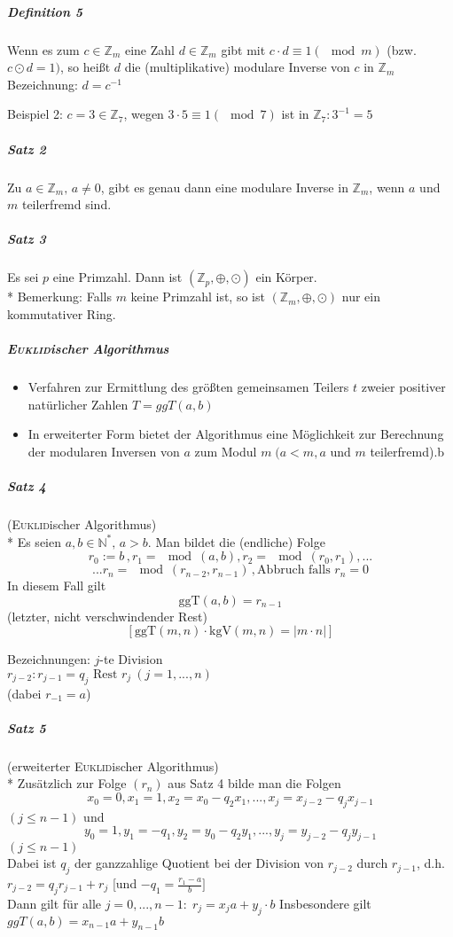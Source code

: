 \documentclass[a4paper]{scrartcl}
\begin{document}
\subparagraph{Definition 5} Wenn es zum $c \in \mathbb{Z}_m$ eine Zahl $d\in \mathbb{Z}_m$ gibt mit $c \cdot d \equiv 1 (\mod{m})$ (bzw. $ c \odot d =1)$, so heißt $d$ die (multiplikative) modulare Inverse von $c$ in $\mathbb{Z}_m$\\
Bezeichnung: $d=c^{-1}$

Beispiel 2: $c=3 \in \mathbb{Z}_7$, wegen $3 \cdot 5 \equiv 1 ( \mod{7})$ ist in $\mathbb{Z}_7: 3^{-1} = 5$

\subparagraph{Satz 2} Zu $a\in \mathbb{Z}_m,\, a\neq 0$, gibt es genau dann eine modulare Inverse in $\mathbb{Z}_m$, wenn $a$ und $m$ teilerfremd sind.

\subparagraph{Satz 3} Es sei $p$ eine Primzahl. Dann ist $(\mathbb{Z}_p,\oplus,\odot)$ ein Körper.\\*
Bemerkung: Falls $m$ keine Primzahl ist, so ist $(\mathbb{Z}_m,\oplus,\odot)$  nur ein kommutativer Ring.

\subparagraph{\textsc{Euklid}ischer Algorithmus}
\begin{itemize}
\item Verfahren zur Ermittlung des größten gemeinsamen Teilers $t$ zweier positiver natürlicher Zahlen $T=ggT(a,b)$
\item In erweiterter Form bietet der Algorithmus eine Möglichkeit zur Berechnung der modularen Inversen von $a$ zum Modul $m \; (a < m, a \text{ und } m$ teilerfremd).b
\end{itemize}

\subparagraph{Satz 4} (\textsc{Euklid}ischer Algorithmus)\\*
Es seien $a,b \in \mathbb{N}^*,\, a >b$. Man bildet die (endliche) Folge
\[ r_0 := b\, , r_1=\mod{(a,b)}, r_2=\mod{(r_0,r_1)},...\]
\[... r_n=\mod{(r_{n-2},r_{n-1})}\, ,\text{Abbruch falls } r_n=0\]
In diesem Fall gilt
\[\text{ggT}(a,b)=r_{n-1}\]
(letzter, nicht verschwindender Rest)
\[ [ \text{ggT}(m,n) \cdot \text{kgV}(m,n)  = \lvert m \cdot n \rvert ] \]

Bezeichnungen: $j$-te Division\\
$r_{j-2}: r_{j-1} = q_j \text{ Rest } r_j \: (j=1,...,n)$ \\
(dabei $r_{-1}=a$)

\subparagraph{Satz 5} (erweiterter \textsc{Euklid}ischer Algorithmus)\\*
Zusätzlich zur Folge $(r_n)$ aus Satz 4 bilde man die Folgen \[x_0 = 0, x_1 =1, x_2 = x_0 - q_2x_1,...,x_j=x_{j-2} - q_j x_{j-1}\]
$(j\leq n-1)$ und
\[y_0=1, y_1=-q_1,y_2=y_0-q_2y_1,...,y_j=y_{j-2}-q_jy_{j-1}\]
$(j\leq n-1)$\\
Dabei ist $q_j$ der ganzzahlige Quotient bei der Division von $r_{j-2}$ durch $r_{j-1}$, d.h. $r_{j-2} = q_jr_{j-1} + r_j$ [und $- q_1  = \frac{r_1 -a}{b}]$\\
Dann gilt für alle $j=0,...,n-1: \; r_j=x_j a + y_j\cdot b$
Insbesondere gilt $ggT(a,b)=x_{n-1}a + y_{n-1}b$
\end{document}
